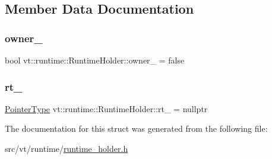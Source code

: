 \subsection{Member Data Documentation}
\mbox{\label{structvt_1_1runtime_1_1_runtime_holder_ae6ae8cff59755abf98bcbd6709e9652f}} 
\subsubsection{\texorpdfstring{owner\+\_\+}{owner\_}}
{\footnotesize\ttfamily bool vt\+::runtime\+::\+Runtime\+Holder\+::owner\+\_\+ = false\hspace{0.3cm}{\ttfamily [private]}}

\mbox{\label{structvt_1_1runtime_1_1_runtime_holder_a6b0f4efb09cd9dd6747aa5e8237e23ff}} 
\subsubsection{\texorpdfstring{rt\+\_\+}{rt\_}}
{\footnotesize\ttfamily \hyperlink{structvt_1_1runtime_1_1_runtime_holder_a9740e8aa7487fcf38b67a7e160d7b046}{Pointer\+Type} vt\+::runtime\+::\+Runtime\+Holder\+::rt\+\_\+ = nullptr\hspace{0.3cm}{\ttfamily [private]}}



The documentation for this struct was generated from the following file\+:\begin{DoxyCompactItemize}
\item 
src/vt/runtime/\hyperlink{runtime__holder_8h}{runtime\+\_\+holder.\+h}\end{DoxyCompactItemize}
